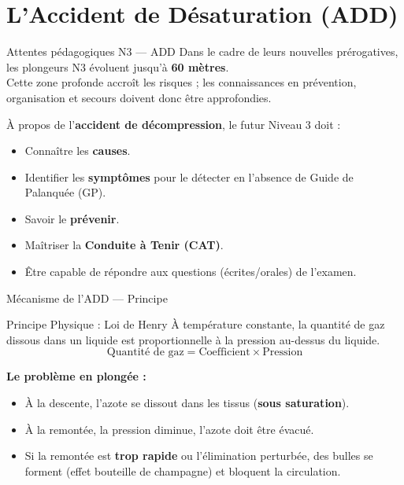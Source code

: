 
\section{L'Accident de Désaturation (ADD)}

\begin{frame}{Attentes pédagogiques N3 — ADD}
    Dans le cadre de leurs nouvelles prérogatives, les plongeurs N3 évoluent jusqu'à \textbf{60 mètres}.\\
    Cette zone profonde accroît les risques ; les connaissances en prévention, organisation et secours doivent donc être approfondies.

    \vspace{1em}
    À propos de l'\textbf{accident de décompression}, le futur Niveau 3 doit :
    \begin{itemize}
        \item Connaître les \textbf{causes}.
        \item Identifier les \textbf{symptômes} pour le détecter en l'absence de Guide de Palanquée (GP).
        \item Savoir le \textbf{prévenir}.
        \item Maîtriser la \textbf{Conduite à Tenir (CAT)}.
        \item Être capable de répondre aux questions (écrites/orales) de l'examen.
    \end{itemize}
\end{frame}

\begin{frame}{Mécanisme de l'ADD — Principe}
    \begin{block}{Principe Physique : Loi de Henry}
        À température constante, la quantité de gaz dissous dans un liquide est proportionnelle à la pression au-dessus du liquide.
        \[ \text{Quantité de gaz} = \text{Coefficient} \times \text{Pression} \]
    \end{block}

    \vspace{1em}
    \textbf{Le problème en plongée :}
    \begin{itemize}
        \item À la descente, l'azote se dissout dans les tissus (\textbf{sous saturation}).
        \item À la remontée, la pression diminue, l'azote doit être évacué.
        \item Si la remontée est \textbf{trop rapide} ou l'élimination perturbée, des bulles se forment (effet bouteille de champagne) et bloquent la circulation.
    \end{itemize}
\end{frame}

